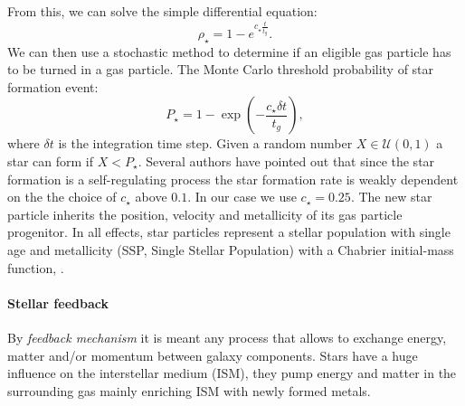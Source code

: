 From this, we can solve the simple differential equation: 
\begin{equation}
\rho_\star = 1 - e^{c_\star \frac{t}{t_g}}.
\end{equation}
We can then use a stochastic method to determine if an eligible gas particle has to be turned in a gas particle.
The Monte Carlo threshold probability of star formation event:
\begin{equation}
P_\star = 1-\exp(-\frac{c_\star \delta t}{t_g}),
\end{equation}
where $\delta t$ is the integration time step.
Given a random number $X \in \mathcal{U}(0,1)$ a star can form if $X < P_\star$.
Several authors \citep{Stinson2006, Revaz2009, Cloet-Osselaer2012} have pointed out that since the star formation is a self-regulating process the star formation rate is weakly dependent on the the choice of $c_\star$ above $0.1$. In our case we use $c_\star = 0.25$.
The new star particle inherits the position, velocity and metallicity of its gas particle progenitor.
In all effects, star particles represent a stellar population with single age and metallicity (SSP, Single Stellar Population) with a Chabrier initial-mass function, \citet{Chabrier2003}.

\paragraph{Stellar feedback}
By \emph{feedback mechanism} it is meant any process that allows to exchange energy, matter and/or momentum between galaxy components. Stars have a huge influence on the interstellar medium (ISM), they pump energy and matter in the surrounding gas mainly enriching ISM with newly formed metals.

